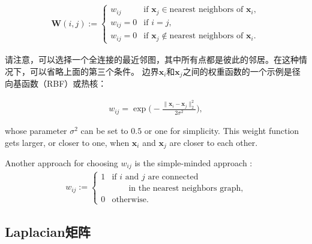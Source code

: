 \documentclass[lang=cn,10pt]{gorgeousnbook}
\numberwithin{equation}{section}%
\numberwithin{figure}{section}%
\begin{document}
\begin{align}\label{equation_adjacency_matrix}
\boldsymbol{W}(i,j) := 
\left\{
    \begin{array}{ll}
        w_{ij} & \mbox{if } \boldsymbol{x}_j \in \text{nearest neighbors of } \boldsymbol{x}_i, \\
        w_{ij} = 0 & \mbox{if } i = j, \\
        w_{ij} = 0 & \mbox{if } \boldsymbol{x}_j \not\in \text{nearest neighbors of } \boldsymbol{x}_i.
    \end{array}
\right.
\end{align}

请注意，可以选择一个全连接的最近邻图，其中所有点都是彼此的邻居。在这种情况下，可以省略上面的第三个条件\cite{ng2001spectral}。
边界$\boldsymbol{x}_i$和$\boldsymbol{x}_j$之间的权重函数的一个示例是径向基函数（RBF）或热核\cite{belkin2001laplacian}：

\begin{align}\label{equation_RBF_kernel}
w_{ij} = \exp\Big(\!\!-\frac{\|\boldsymbol{x}_i - \boldsymbol{x}_j\|_2^2}{2 \sigma^2}\Big),
\end{align}

whose parameter $\sigma^2$ can be set to $0.5$ or one for simplicity. This weight function gets larger, or closer to one, when $\boldsymbol{x}_i$ and $\boldsymbol{x}_j$ are closer to each other. 

Another approach for choosing $w_{ij}$ is the simple-minded approach \cite{belkin2001laplacian}:
\begin{align}\label{equation_simple_minded}
w_{ij} := 
\left\{
    \begin{array}{ll}
        1 & \mbox{if } i \text{ and } j \text{ are connected} \\
        & \quad \quad \text{in the nearest neighbors graph}, \\
        0 & \mbox{otherwise. } 
    \end{array}
\right.
\end{align}


\subsection{Laplacian矩阵}\label{section_Laplacian_matrix_definition}
\end{document}
